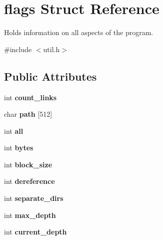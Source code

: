\hypertarget{structflags}{}\section{flags Struct Reference}
\label{structflags}


Holds information on all aspects of the program.  




{\ttfamily \#include $<$util.\+h$>$}

\subsection*{Public Attributes}
\begin{DoxyCompactItemize}
\item 
\mbox{\label{structflags_a412c193f46f3b6e7e6fd8f60afcf2a22}} 
int {\bfseries count\+\_\+links}
\item 
\mbox{\label{structflags_a0dcfa95f49b006c4a7eae716dcb881f6}} 
char {\bfseries path} \mbox{[}512\mbox{]}
\item 
\mbox{\label{structflags_a4eae820ce59ad855317d780fb898e4b9}} 
int {\bfseries all}
\item 
\mbox{\label{structflags_a65ee8e114f87ed6aa5f4faaed99b0516}} 
int {\bfseries bytes}
\item 
\mbox{\label{structflags_a9a3526f165b7d84c26b72138e048962f}} 
int {\bfseries block\+\_\+size}
\item 
\mbox{\label{structflags_ab54043aad424c17ea05c8480008f21a9}} 
int {\bfseries dereference}
\item 
\mbox{\label{structflags_a97347adf295e6fea8d176e8040cab410}} 
int {\bfseries separate\+\_\+dirs}
\item 
\mbox{\label{structflags_aec7b8bc1d02de4252246fcf1834b0f9e}} 
int {\bfseries max\+\_\+depth}
\item 
\mbox{\label{structflags_a2258ce802008e7dfe4204fe0024f6786}} 
int {\bfseries current\+\_\+depth}
\item 

\end{DoxyCompactItemize}
